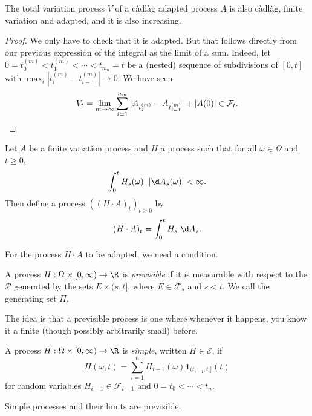\documentclass[a4paper]{article}
\begin{document}
\begin{prop}
  The total variation process $V$ of a c\`adl\`ag adapted process $A$ is also c\`adl\`ag, finite variation and adapted, and it is also increasing.
\end{prop}

\begin{proof}
  We only have to check that it is adapted. But that follows directly from our previous expression of the integral as the limit of a sum. Indeed, let $0 = t_0^{(m)} < t_1^{(m)} < \cdots < t_{n_m} = t$ be a (nested) sequence of subdivisions of $[0, t]$ with $\max_i |t_i^{(m)} - t_{i - 1}^{(m)}| \to 0$. We have seen
  \[
    V_t = \lim_{m \to \infty} \sum_{i = 1}^{n_m} |A_{t_i^{(m)}} - A_{t_{i - 1}^{(m)}}| + |A(0)| \in \mathcal{F}_t.\qedhere
  \]
\end{proof}

\begin{defi}[$(H\cdot A)_t$]
  Let $A$ be a finite variation process and $H$ a process such that for all $\omega \in \Omega$ and $t \geq 0$,
  \[
    \int_0^t H_s(\omega)|\;|\d A_s(\omega)| < \infty.
  \]
  Then define a process $((H \cdot A)_t)_{t \geq 0}$ by
  \[
    (H \cdot A)_t = \int_0^t H_s\;\d A_s.
  \]
\end{defi}
For the process $H \cdot A$ to be adapted, we need a condition.
\begin{defi}
  A process $H: \Omega \times [0, \infty) \to \R$ is \emph{previsible} if it is measurable with respect to the  $\mathcal{P}$ generated by the sets $E \times (s, t]$, where $E \in \mathcal{F}_s$ and $s < t$. We call the generating set $\Pi$.
\end{defi}
The idea is that a previsible process is one where whenever it happens, you know it a finite (though possibly arbitrarily small) before.

\begin{defi}
  A process $H: \Omega \times [0, \infty) \to \R$ is \emph{simple}, written $H \in \mathcal{E}$, if
  \[
    H(\omega, t) = \sum_{i = 1}^n H_{i - 1}(\omega) \mathbf{1}_{(t_{i - 1}, t_i]}(t)
  \]
  for random variables $H_{i - 1} \in \mathcal{F}_{i - 1}$ and $0 = t_0 < \cdots < t_n$.
\end{defi}

\begin{fact}
  Simple processes and their limits are previsible.
\end{fact}
\end{document}
